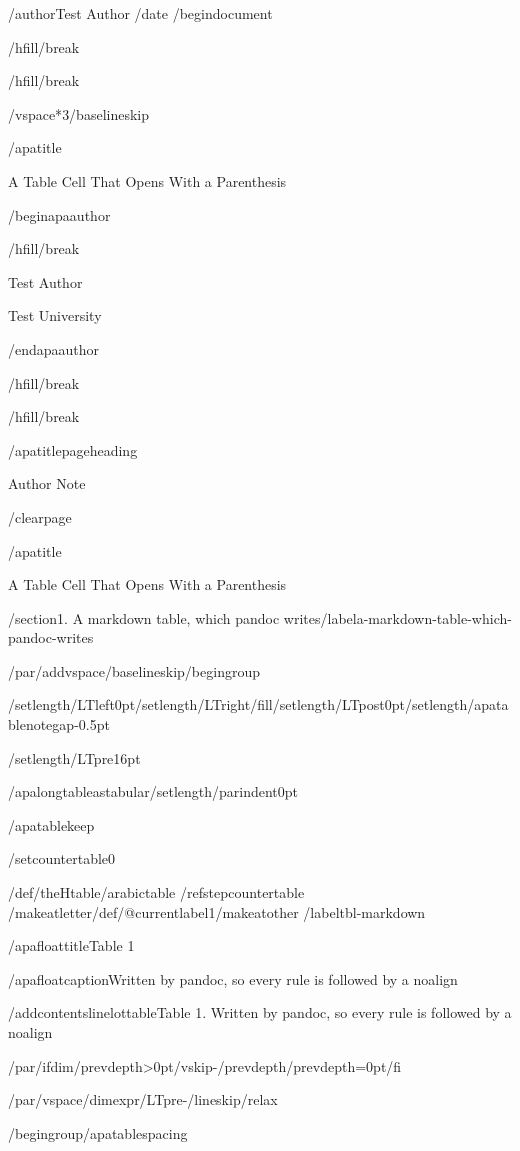 /author{Test Author}
/date{}
/begin{document}


/hfill/break

/hfill/break

/vspace*{3/baselineskip}

/apatitle{

A Table Cell That Opens With a Parenthesis

}

/begin{apaauthor}

/hfill/break

Test Author

Test University

/end{apaauthor}

/hfill/break

/hfill/break

/apatitlepageheading{

Author Note

}

/clearpage

/apatitle{

A Table Cell That Opens With a Parenthesis

}

/section{1. A markdown table, which pandoc
writes}/label{a-markdown-table-which-pandoc-writes}

/par/addvspace{/baselineskip}/begingroup

/setlength{/LTleft}{0pt}/setlength{/LTright}{/fill}/setlength{/LTpost}{0pt}/setlength{/apatablenotegap}{-0.5pt}

/setlength{/LTpre}{16pt}

/apalongtableastabular/setlength{/parindent}{0pt}

/apatablekeep

/setcounter{table}{0}

/def/theHtable{/arabic{table}}%
/refstepcounter{table}%
/makeatletter/def/@currentlabel{1}/makeatother%
/label{tbl-markdown}

/apafloattitle{Table 1}

/apafloatcaption{Written by pandoc, so every rule is followed by a
noalign}

/addcontentsline{lot}{table}{Table 1. Written by pandoc, so every rule
is followed by a noalign}

/par/ifdim/prevdepth>0pt/vskip-/prevdepth/prevdepth=0pt/fi

/par/vspace{/dimexpr/LTpre-/lineskip/relax}

/begingroup/apatablespacing

